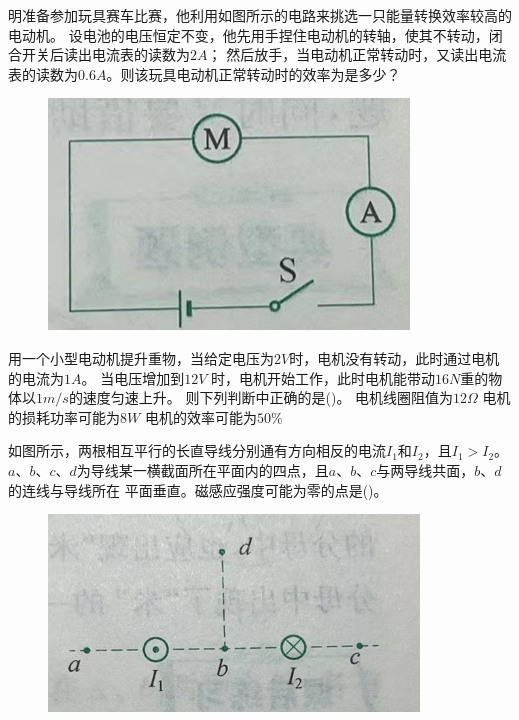 \documentclass[a4paper,cs4size]{BHCexam}
\begin{document}
\begin{groups}
\begin{questions}[]
        \question[5] 明准备参加玩具赛车比赛，他利用如图所示的电路来挑选一只能量转换效率较高的电动机。
        设电池的电压恒定不变，他先用手捏住电动机的转轴，使其不转动，闭合开关后读出电流表的读数为$2A$；
        然后放手，当电动机正常转动时，又读出电流表的读数为$0.6A$。则该玩具电动机正常转动时的效率为是多少？
        \begin{figure}[htb]
            \flushright
            \includegraphics [scale=0.6,trim=0 0 0 0]{./image/physics_circuit5_2.png}
            \label{fig:fig_circuit5_2}
        \end{figure}
        \vspace{2.5cm}

        \question[5] 用一个小型电动机提升重物，当给定电压为$2V$时，电机没有转动，此时通过电机的电流为$1A$。
        当电压增加到$12V$ 时，电机开始工作，此时电机能带动$16N$重的物体以$1m/s$的速度匀速上升。
        则下列判断中正确的是(\quad\quad\quad)。
        {电机线圈阻值为$12\Omega$}
        {电机的损耗功率可能为$8W$}
        {电机的效率可能为$50\%$}
        \vspace{2.5cm}


        \question[5] 如图所示，两根相互平行的长直导线分别通有方向相反的电流$I_1$和$I_2$，且$I_1>I_2$。
        $a$、$b$、$c$、$d$为导线某一横截面所在平面内的四点，且$a$、$b$、$c$与两导线共面，$b$、$d$的连线与导线所在
        平面垂直。磁感应强度可能为零的点是(\quad\quad\quad)。
        \begin{figure}[htb]
            \flushright
            \includegraphics [scale=0.7,trim=0 0 0 0]{./image/physics_circuit5_3.png}
            \label{fig:fig_circuit5_3}
        \end{figure}
        \vspace{2.5cm}


\end{questions}
\end{groups}
\end{document}
